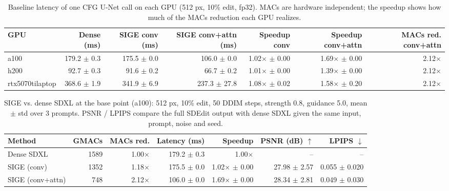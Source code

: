 \begin{table}[t]
\centering
\small
\caption{Baseline latency of one CFG U-Net call on each GPU (512 px, 10\% edit, fp32). MACs are hardware independent; the speedup shows how much of the MACs reduction each GPU realizes.}
\label{tab:machines}
\begin{tabular}{lrrrrrr}
\toprule
GPU & Dense (ms) & SIGE conv (ms) & SIGE conv+attn (ms) & Speedup conv & Speedup conv+attn & MACs red. conv+attn \\
\midrule
a100 & 179.2 $\pm$ 0.3 & 175.5 $\pm$ 0.0 & 106.0 $\pm$ 0.0 & 1.02$\times$ $\pm$ 0.00 & 1.69$\times$ $\pm$ 0.00 & 2.12$\times$ \\
h200 & 92.7 $\pm$ 0.3 & 91.6 $\pm$ 0.2 & 66.7 $\pm$ 0.2 & 1.01$\times$ $\pm$ 0.00 & 1.39$\times$ $\pm$ 0.00 & 2.12$\times$ \\
rtx5070tilaptop & 368.6 $\pm$ 1.9 & 341.9 $\pm$ 6.9 & 237.3 $\pm$ 27.8 & 1.08$\times$ $\pm$ 0.02 & 1.58$\times$ $\pm$ 0.20 & 2.12$\times$ \\
\bottomrule
\end{tabular}
\end{table}

\begin{table}[t]
\centering
\small
\caption{SIGE vs. dense SDXL at the base point (a100): 512 px, 10\% edit, 50 DDIM steps, strength 0.8, guidance 5.0, mean $\pm$ std over 3 prompts. PSNR / LPIPS compare the full SDEdit output with dense SDXL given the same input, prompt, noise and seed.}
\label{tab:baseline_a100}
\begin{tabular}{lrrrrrr}
\toprule
Method & GMACs & MACs red. & Latency (ms) & Speedup & PSNR (dB) $\uparrow$ & LPIPS $\downarrow$ \\
\midrule
Dense SDXL & 1589 & 1.00$\times$ & 179.2 $\pm$ 0.3 & 1.00$\times$ & -- & -- \\
SIGE (conv) & 1352 & 1.18$\times$ & 175.5 $\pm$ 0.0 & 1.02$\times$ $\pm$ 0.00 & 27.98 $\pm$ 2.57 & 0.055 $\pm$ 0.020 \\
SIGE (conv+attn) & 748 & 2.12$\times$ & 106.0 $\pm$ 0.0 & 1.69$\times$ $\pm$ 0.00 & 28.34 $\pm$ 2.81 & 0.049 $\pm$ 0.030 \\
\bottomrule
\end{tabular}
\end{table}


